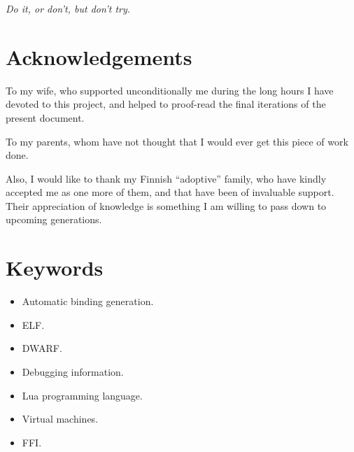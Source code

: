 \documentclass[a4paper,
	fontsize=12pt,
	titlepage=firstiscover,
	chapterprefix=true,
	appendixprefix=true,
	headings=big,
	headsepline,
	toc=bibliographynumbered,
	twoside]{scrbook}
\begin{document}
\frontmatter

\clearpage
\listoftodos

\cleardoublepage
\begin{minipage}[t][6cm][l]{\textwidth}
	\vspace{10cm}
	\begin{flushright}
		\textit{Do it, or don't, but don't try.}
	\end{flushright}
\end{minipage}

\cleardoublepage
\chapter*{Acknowledgements}


\begin{minipage}{0.6\textwidth}
\begin{raggedleft} \itshape

To my wife, who supported unconditionally me during the long hours I have
devoted to this project, and helped to proof-read the final iterations of the
present document.

\vspace{2cm}

To my parents, whom have not thought that I would ever get this piece of work
done.

\vspace{2cm}

Also, I would like to thank my Finnish “adoptive” family, who have kindly
accepted me as one more of them, and that have been of invaluable support.
Their appreciation of knowledge is something I am willing to pass down to
upcoming generations.

\end{raggedleft}
\end{minipage}


\cleardoublepage


\cleardoublepage
\chapter*{Keywords}
\begin{itemize}
	\item Automatic binding generation.
	\item ELF.
	\item DWARF.
	\item Debugging information.
	\item Lua programming language.
	\item Virtual machines.
	\item FFI.
\end{itemize}

\cleardoublepage
\tableofcontents
\listoffigures
\listoftables
\listoflistings

\mainmatter
\pagestyle{scrheadings}






\backmatter
\cleardoublepage
\printglossaries


\end{document}
